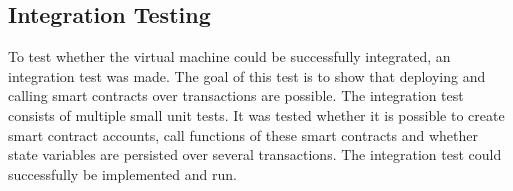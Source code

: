 \subsection{Integration Testing}
To test whether the virtual machine could be successfully integrated, an integration test was made. The goal of this test is to show that deploying and calling smart contracts over transactions are possible. The integration test consists of multiple small unit tests. It was tested whether it is possible to create smart contract accounts, call functions of these smart contracts and whether state variables are persisted over several transactions. The integration test could successfully be implemented and run.
